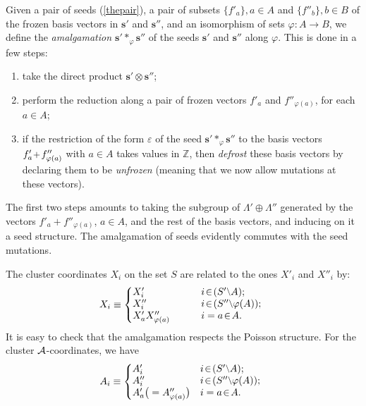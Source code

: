 \documentclass[12pt,hyperref,compress]{JHEP3}
\newcommand{\eq}[1]{\begin{equation}#1\end{equation}}
\newcommand{\pl}{\hspace{0.5pt}\text{{\small+}}\hspace{-0.5pt}}
\begin{document}
Given a pair of seeds (\ref{thepair}), a pair of subsets $\{f'_a\}, a\in A$ and $\{f''_b\}, b\in B$ of the frozen basis vectors in ${\mathbf s}'$ and ${\mathbf s}''$, and an isomorphism of sets $\varphi: A\!\to\!B$, we define the {\it amalgamation ${\mathbf s}'\ast_{\varphi}{\mathbf s}''$} of the seeds ${\mathbf s}'$ and ${\mathbf s}''$ along $\varphi$. This is done in a few steps:\\[-25pt]
\begin{enumerate}
\item take the direct product ${\mathbf s}'\!\otimes\!{\mathbf s}''$;\\[-25pt]
\item perform the reduction along a pair of frozen vectors $f'_a$ and $f''_{\varphi(a)}$, for each $a\in A$;\\[-25pt]
\item if the restriction of the form $\varepsilon$ of the seed ${\mathbf s}'\ast_{\varphi}{\mathbf s}''$ to the basis vectors $f'_a\pl\,f''_{\varphi(a)}$ with $a\in A$ takes values in $\mathbb{Z}$, then {\it defrost} these basis vectors by declaring them to be {\it unfrozen} (meaning that we now allow mutations at these vectors).\\[-25pt]
\end{enumerate}
The first two steps amounts to taking the subgroup of $\Lambda'\oplus \Lambda''$ generated by the vectors $f'_a + f''_{\varphi(a)}$, $a\in A$, and the rest of the basis vectors, and inducing on it a seed structure. The amalgamation of seeds evidently commutes with the seed mutations.

The cluster coordinates $X_i$ on the set $S$ are related to the ones $X'_i$ and $X''_i$ by:
\vspace{-.2cm}\eq{X_i\equiv\left\{\begin{array}{@{}l@{$\qquad\;\;\;\,\,$}l}X_i'&i\!\in\!(S'\raisebox{1pt}{\text{{\footnotesize$\backslash$}}} A);\\X_i''&i\!\in\!(S''\raisebox{1pt}{\text{{\footnotesize$\backslash$}}} \varphi(A));\\X_a'X''_{\varphi(a)}&i=a\!\in\!A.\end{array}\right.\vspace{-.2cm}\label{restrx}}
It is easy to check that the amalgamation respects the Poisson structure. For the cluster ${\cal A}$-coordinates, we have
\vspace{-.2cm}\eq{A_i\equiv\left\{\begin{array}{@{}l@{$\quad$}l}A_i'&i\!\in\!(S'\raisebox{1pt}{\text{{\footnotesize$\backslash$}}} A);\\A_i''&i\!\in\!(S''\raisebox{1pt}{\text{{\footnotesize$\backslash$}}} \varphi(A));\\A_a'\big(=A''_{\varphi(a)}\big)&i=a\!\in\!A.\end{array}\right.\vspace{-.2cm}\label{restra}}
\end{document}
